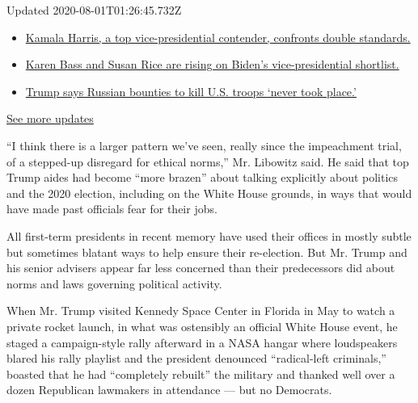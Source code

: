 Updated 2020-08-01T01:26:45.732Z

\begin{itemize}
\tightlist
\item
  \href{https://www.nytimes.com/2020/07/31/us/elections/biden-vs-trump.html?action=click\&pgtype=Article\&state=default\&region=MAIN_CONTENT_1\&context=storylines_live_updates\#link-29fdff45}{Kamala
  Harris, a top vice-presidential contender, confronts double
  standards.}
\item
  \href{https://www.nytimes.com/2020/07/31/us/elections/biden-vs-trump.html?action=click\&pgtype=Article\&state=default\&region=MAIN_CONTENT_1\&context=storylines_live_updates\#link-13ec3d9c}{Karen
  Bass and Susan Rice are rising on Biden's vice-presidential
  shortlist.}
\item
  \href{https://www.nytimes.com/2020/07/31/us/elections/biden-vs-trump.html?action=click\&pgtype=Article\&state=default\&region=MAIN_CONTENT_1\&context=storylines_live_updates\#link-49e9a016}{Trump
  says Russian bounties to kill U.S. troops `never took place.'}
\end{itemize}

\href{https://www.nytimes.com/2020/07/31/us/elections/biden-vs-trump.html?action=click\&pgtype=Article\&state=default\&region=MAIN_CONTENT_1\&context=storylines_live_updates}{See
more updates}

``I think there is a larger pattern we've seen, really since the
impeachment trial, of a stepped-up disregard for ethical norms,'' Mr.
Libowitz said. He said that top Trump aides had become ``more brazen''
about talking explicitly about politics and the 2020 election, including
on the White House grounds, in ways that would have made past officials
fear for their jobs.

All first-term presidents in recent memory have used their offices in
mostly subtle but sometimes blatant ways to help ensure their
re-election. But Mr. Trump and his senior advisers appear far less
concerned than their predecessors did about norms and laws governing
political activity.

When Mr. Trump visited Kennedy Space Center in Florida in May to watch a
private rocket launch, in what was ostensibly an official White House
event, he staged a campaign-style rally afterward in a NASA hangar where
loudspeakers blared his rally playlist and the president denounced
``radical-left criminals,'' boasted that he had ``completely rebuilt''
the military and thanked well over a dozen Republican lawmakers in
attendance --- but no Democrats.

